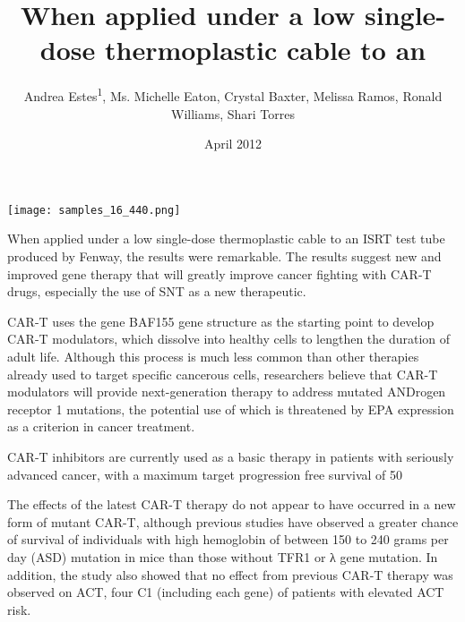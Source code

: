 \documentclass{article}
\title{When applied under a low single-dose thermoplastic cable to an}
\author{Andrea Estes\textsuperscript{1},  Ms. Michelle Eaton,  Crystal Baxter,  Melissa Ramos,  Ronald Williams,  Shari Torres}
\affil{\textsuperscript{1}Wuhan University}
\date{April 2012}
\begin{document}
\maketitle

\begin{center}
\begin{minipage}{0.75\linewidth}
\texttt{[image: samples\_16\_440.png]}
\end{minipage}
\end{center}

When applied under a low single-dose thermoplastic cable to an ISRT test tube produced by Fenway, the results were remarkable. The results suggest new and improved gene therapy that will greatly improve cancer fighting with CAR-T drugs, especially the use of SNT as a new therapeutic.

CAR-T uses the gene BAF155 gene structure as the starting point to develop CAR-T modulators, which dissolve into healthy cells to lengthen the duration of adult life. Although this process is much less common than other therapies already used to target specific cancerous cells, researchers believe that CAR-T modulators will provide next-generation therapy to address mutated ANDrogen receptor 1 mutations, the potential use of which is threatened by EPA expression as a criterion in cancer treatment.

CAR-T inhibitors are currently used as a basic therapy in patients with seriously advanced cancer, with a maximum target progression free survival of 50%

The effects of the latest CAR-T therapy do not appear to have occurred in a new form of mutant CAR-T, although previous studies have observed a greater chance of survival of individuals with high hemoglobin of between 150 to 240 grams per day (ASD) mutation in mice than those without TFR1 or λ gene mutation. In addition, the study also showed that no effect from previous CAR-T therapy was observed on ACT, four C1 (including each gene) of patients with elevated ACT risk.
\end{document}
